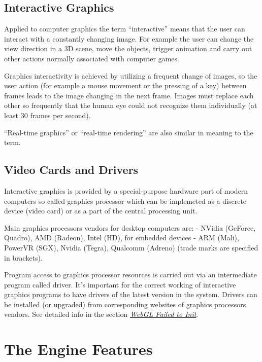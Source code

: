 \documentclass[a4paper,12pt,oneside]{sphinxmanual}
\begin{document}

\section{Interactive Graphics}
\label{about:about-interactive-graphics}\label{about:id12}\label{about:index-9}
Applied to computer graphics the term ``interactive'' means that the user can interact with a constantly changing image. For example the user can change the view direction in a 3D scene, move the objects, trigger animation and carry out other actions normally associated with computer games.

Graphics interactivity is achieved by utilizing a frequent change of images, so the user action (for example a mouse movement or the pressing of a key) between frames leads to the image changing in the next frame. Images must replace each other so frequently that the human eye could not recognize them individually (at least 30 frames per second).

``Real-time graphics'' or ``real-time rendering'' are also similar in meaning to the term.


\section{Video Cards and Drivers}
\label{about:id13}\label{about:about-drivers-video-cards}\label{about:index-10}
Interactive graphics is provided by a special-purpose hardware part of modern computers so called graphics processor which can be implemeted as a discrete device (video card) or as a part of the central processing unit.

Main graphics processors vendors for desktop computers are:  - NVidia (GeForce, Quadro), AMD (Radeon), Intel (HD), for embedded devices - ARM (Mali), PowerVR (SGX), Nvidia (Tegra), Qualcomm (Adreno) (trade marks are specified in brackets).

Program access to graphics processor resources is carried out via an intermediate program called driver. It's important for the correct working of interactive graphics programs to have drivers of the latest version in the system. Drivers can be installed (or upgraded) from corresponding websites of graphics processors vendors. See detailed info in the section {\hyperref[problems_and_solutions:webgl-not-working]{\emph{WebGL Failed to Init}}}.


\chapter{The Engine Features}
\label{features::doc}\label{features:features}\label{features:id1}
\end{document}
